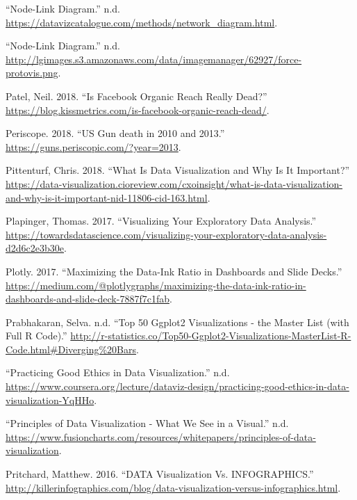 \documentclass[]{book}
\begin{document}
\leavevmode\hypertarget{ref-node-link}{}%
``Node-Link Diagram.'' n.d. \url{https://datavizcatalogue.com/methods/network_diagram.html}.

\leavevmode\hypertarget{ref-node-link-diag}{}%
``Node-Link Diagram.'' n.d. \url{http://lgimages.s3.amazonaws.com/data/imagemanager/62927/force-protovis.png}.

\leavevmode\hypertarget{ref-facebook_organic}{}%
Patel, Neil. 2018. ``Is Facebook Organic Reach Really Dead?'' \url{https://blog.kissmetrics.com/is-facebook-organic-reach-dead/}.

\leavevmode\hypertarget{ref-narratives_2017}{}%
Periscope. 2018. ``US Gun death in 2010 and 2013.'' \url{https://guns.periscopic.com/?year=2013}.

\leavevmode\hypertarget{ref-viz_importance}{}%
Pittenturf, Chris. 2018. ``What Is Data Visualization and Why Is It Important?'' \url{https://data-visualization.cioreview.com/cxoinsight/what-is-data-visualization-and-why-is-it-important-nid-11806-cid-163.html}.

\leavevmode\hypertarget{ref-Visualizing_DataAnalysis}{}%
Plapinger, Thomas. 2017. ``Visualizing Your Exploratory Data Analysis.'' \url{https://towardsdatascience.com/visualizing-your-exploratory-data-analysis-d2d6c2e3b30e}.

\leavevmode\hypertarget{ref-appli_2017}{}%
Plotly. 2017. ``Maximizing the Data-Ink Ratio in Dashboards and Slide Decks.'' \url{https://medium.com/@plotlygraphs/maximizing-the-data-ink-ratio-in-dashboards-and-slide-deck-7887f7c1fab}.

\leavevmode\hypertarget{ref-viz_R}{}%
Prabhakaran, Selva. n.d. ``Top 50 Ggplot2 Visualizations - the Master List (with Full R Code).'' \url{http://r-statistics.co/Top50-Ggplot2-Visualizations-MasterList-R-Code.html\#Diverging\%20Bars}.

\leavevmode\hypertarget{ref-Practicing_Good_Ethics_in_Data_Visualization}{}%
``Practicing Good Ethics in Data Visualization.'' n.d. \url{https://www.coursera.org/lecture/dataviz-design/practicing-good-ethics-in-data-visualization-YqHHo}.

\leavevmode\hypertarget{ref-fusioncharts}{}%
``Principles of Data Visualization - What We See in a Visual.'' n.d. \url{https://www.fusioncharts.com/resources/whitepapers/principles-of-data-visualization}.

\leavevmode\hypertarget{ref-VIZVSINFO}{}%
Pritchard, Matthew. 2016. ``DATA Visualization Vs. INFOGRAPHICS.'' \url{http://killerinfographics.com/blog/data-visualization-versus-infographics.html}.
\end{document}
